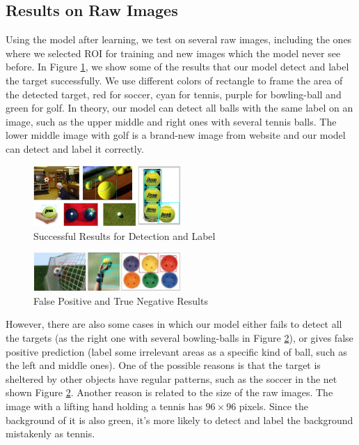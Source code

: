 \documentclass{article}
\begin{document}
\subsection{Results on Raw Images}
Using the model after learning, we test on several raw images, including the ones where we selected ROI for training and new images which the model never see before. In Figure \ref{fig:succefulResult}, we show some of the results that our model detect and label the target successfully. We use different colors of rectangle to frame the area of the detected target, red for soccer, cyan for tennis, purple for bowling-ball and green for golf. In theory, our model can detect all balls with the same label on an image, such as the upper middle and right ones with several tennis balls. The lower middle image with golf is a brand-new image from website and our model can detect and label it correctly. \\

\begin{figure}[htb]
\centering
\includegraphics[width=0.5\textwidth]{successfulResult.jpg}
\caption{Successful Results for Detection and Label}
\label{fig:succefulResult}
\end{figure}

\begin{figure}[htp]
\centering
\includegraphics[width=0.5\textwidth]{failedResult.jpg}
\caption{False Positive and True Negative Results}
\label{fig:failedResult}
\end{figure}

However, there are also some cases in which our model either fails to detect all the targets (as the right one with several bowling-balls in Figure \ref{fig:failedResult}), or gives false positive prediction (label some irrelevant areas as a specific kind of ball, such as the left and middle ones). One of the possible reasons is that the target is sheltered by other objects have regular patterns, such as the soccer in the net shown Figure \ref{fig:failedResult}. Another reason is related to the size of the raw images. The image with a lifting hand holding a tennis has $96\times96$ pixels. Since the background of it is also green, it's more likely to detect and label the background mistakenly as tennis.
\end{document}
